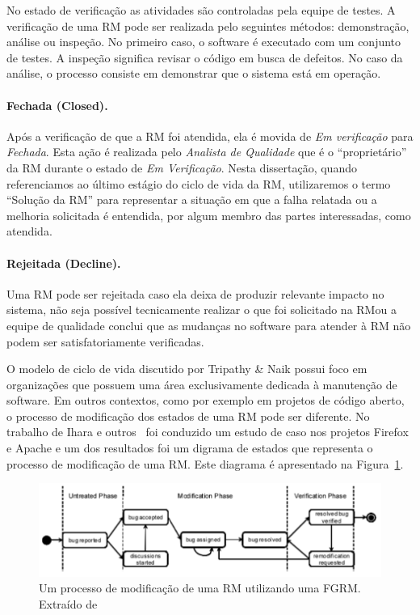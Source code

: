 No estado de verificação as atividades são controladas pela equipe de testes.  A
verificação de uma RM pode ser realizada pelo seguintes métodos: demonstração,
análise ou inspeção. No primeiro caso, o software é executado com um conjunto de
testes. A inspeção significa revisar o código em busca de defeitos. No caso da
análise, o processo consiste em demonstrar que o sistema está em operação.

\paragraph{Fechada (Closed).}
\label{par:fechada}

Após a verificação de que a RM foi atendida, ela é movida de \textit{Em
    verificação} para \textit{Fechada}. Esta ação é realizada pelo
\textit{Analista de Qualidade} que é o ``proprietário'' da RM durante o estado
de \textit{Em Verificação}. Nesta dissertação, quando referenciamos ao último
estágio do ciclo de vida da RM, utilizaremos o termo ``Solução da RM'' para
representar a situação em que a falha relatada ou a melhoria solicitada é
entendida, por algum membro das partes interessadas, como atendida.

\paragraph{Rejeitada (Decline).}
\label{par:rejeitada}

Uma RM pode ser rejeitada caso ela deixa de produzir relevante impacto no
sistema, não seja possível tecnicamente realizar o que foi solicitado na RM\@ ou
a equipe de qualidade conclui que as mudanças no software para atender à RM não
podem ser satisfatoriamente verificadas.

O modelo de ciclo de vida discutido por Tripathy \& Naik possui foco em
organizações que possuem uma área exclusivamente dedicada à manutenção de
software. Em outros contextos, como por exemplo em projetos de código aberto, o
processo de modificação dos estados de uma RM pode ser diferente. No trabalho de
Ihara e outros~\cite{ihara2009analysis} foi conduzido um estudo de caso nos
projetos Firefox e Apache e um dos resultados foi um digrama de estados que
representa o processo de modificação de uma RM\@. Este diagrama é apresentado na
Figura~\ref{fig:diagrama-estado-rm-codigo-aberto}.

\begin{figure}[htpb]
	\centering
    \includegraphics[width=0.8\linewidth]{./chapter-manutencao-software-visao-geral/img/diagrama-estado-rm-codigo-aberto.pdf}
	\caption{Um processo de modificação de uma RM utilizando uma FGRM\@. Extraído
	de~\cite{ihara2009analysis}}
\label{fig:diagrama-estado-rm-codigo-aberto}
\end{figure}

